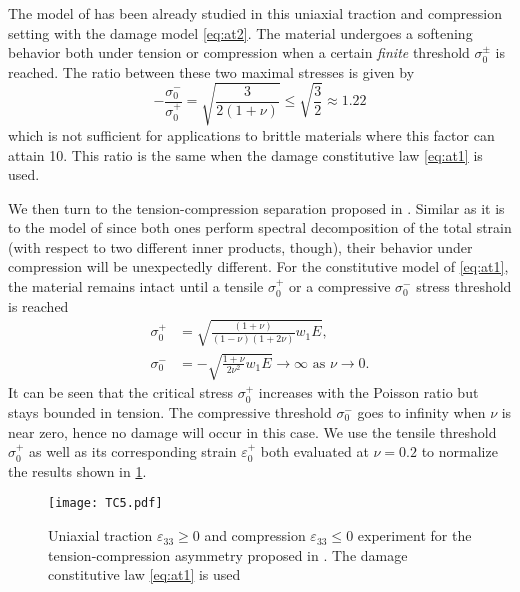 The model of \cite{AmorMarigoMaurini:2009} has been already studied in this uniaxial traction and compression setting with the damage model \eqref{eq:at2}. The material undergoes a softening behavior both under tension or compression when a certain \emph{finite} threshold $\sigma_0^\pm$ is reached. The ratio between these two maximal stresses is given by
\[
-\frac{\sigma_0^-}{\sigma_0^+}=\sqrt{\frac{3}{2(1+\nu)}}\leq\sqrt{\frac{3}{2}}\approx 1.22
\]
which is not sufficient for applications to brittle materials where this factor can attain 10. This ratio is the same when the damage constitutive law \eqref{eq:at1} is used.

We then turn to the tension-compression separation proposed in \cite{MieheHofackerWelschinger:2010}. Similar as it is to the model of \cite{FreddiRoyer-Carfagni:2010} since both ones perform spectral decomposition of the total strain (with respect to two different inner products, though), their behavior under compression will be unexpectedly different. For the constitutive model of \eqref{eq:at1}, the material remains intact until a tensile $\sigma_0^+$ or a compressive $\sigma_0^-$ stress threshold is reached
\begin{align*}
\sigma_0^+ &= \sqrt{\frac{(1+\nu)}{(1-\nu)(1+2\nu)}w_1E}, \\
\sigma_0^- &= -\sqrt{\frac{1+\nu}{2\nu^2}w_1E}\to\infty\text{ as $\nu\to 0$}.
\end{align*}
It can be seen that the critical stress $\sigma_0^+$ increases with the Poisson ratio but stays bounded in tension. The compressive threshold $\sigma_0^-$ goes to infinity when $\nu$ is near zero, hence no damage will occur in this case. We use the tensile threshold $\sigma_0^+$ as well as its corresponding strain $\varepsilon_0^+$ both evaluated at $\nu=0.2$ to normalize the results shown in \cref{fig:miehe}.
\begin{figure}[htbp]
\centering
\texttt{[image: TC5.pdf]}
\caption{Uniaxial traction $\varepsilon_{33}\geq 0$ and compression $\varepsilon_{33}\leq 0$ experiment for the tension-compression asymmetry proposed in \cite{MieheHofackerWelschinger:2010}. The damage constitutive law \eqref{eq:at1} is used} \label{fig:miehe}
\end{figure}

